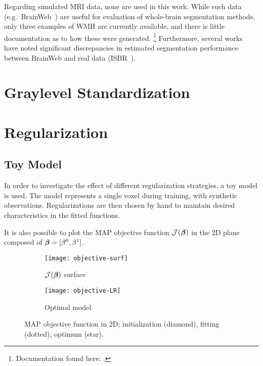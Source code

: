 Regarding simulated MRI data, none are used in this work.
While such data (e.g.\ BrainWeb~\cite{Collins1998})
are useful for evaluation of whole-brain segmentation methods,
only three examples of WMH are currently available,
and there is little documentation as to how these were generated.%
\footnote{Documentation found here:
  .}
Furthermore, several works~\cite{Klauschen2009,Eggert2012} have noted significant discrepancies
in estimated segmentation performance between BrainWeb and real data (ISBR~\cite{IBSR}).
\section{Graylevel Standardization}


\section{Regularization}


\subsection{Toy Model}\label{ss:toyreg}
In order to investigate the effect of different regularization strategies, a toy model is used.
The model represents a single voxel during training, with synthetic observations.
Regularizations are then chosen by hand to maintain desired characteristics in the fitted functions.
\par
It is also possible to plot the MAP objective function $\mathcal{J}(\bm{\beta})$
in the 2D plane composed of $\bm{\beta} = [\beta^0,\beta^1]$.
\begin{figure}
  \centering
  \begin{subfigure}{\plotwidth}
    \centering\texttt{[image: objective-surf]}
    \caption{$\mathcal{J}(\bm{\beta})$ surface}%
    \label{fig:obj-surf}
  \end{subfigure}
  \begin{subfigure}{\plotwidth}
    \centering\texttt{[image: objective-LR]}
    \caption{Optimal model}%
    \label{fig:obj-lr}
  \end{subfigure}
  \caption{MAP objective function in 2D\@;
    initialization (diamond), fitting (dotted), optimum (star).}
\end{figure}

